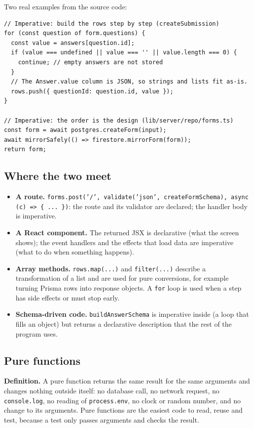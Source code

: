 \documentclass[11pt,a4paper]{article}
\begin{document}
Two real examples from the source code:
\begin{lstlisting}
// Imperative: build the rows step by step (createSubmission)
for (const question of form.questions) {
  const value = answers[question.id];
  if (value === undefined || value === '' || value.length === 0) {
    continue; // empty answers are not stored
  }
  // The Answer.value column is JSON, so strings and lists fit as-is.
  rows.push({ questionId: question.id, value });
}

// Imperative: the order is the design (lib/server/repo/forms.ts)
const form = await postgres.createForm(input);
await mirrorSafely(() => firestore.mirrorForm(form));
return form;
\end{lstlisting}

\subsection{Where the two meet}
\begin{itemize}
  \item \textbf{A route.} \texttt{forms.post('/', validate('json', createFormSchema), async (c) => \{ ... \})}: the route and its validator are declared; the handler body is imperative.
  \item \textbf{A React component.} The returned JSX is declarative (what the screen shows); the event handlers and the effects that load data are imperative (what to do when something happens).
  \item \textbf{Array methods.} \texttt{rows.map(...)} and \texttt{filter(...)} describe a transformation of a list and are used for pure conversions, for example turning Prisma rows into response objects. A \texttt{for} loop is used when a step has side effects or must stop early.
  \item \textbf{Schema-driven code.} \texttt{buildAnswerSchema} is imperative inside (a loop that fills an object) but returns a declarative description that the rest of the program uses.
\end{itemize}

\subsection{Pure functions}\label{sec:pure}
\textbf{Definition.} A pure function returns the same result for the same arguments and changes nothing outside itself: no database call, no network request, no \texttt{console.log}, no reading of \texttt{process.env}, no clock or random number, and no change to its arguments. Pure functions are the easiest code to read, reuse and test, because a test only passes arguments and checks the result.
\end{document}
